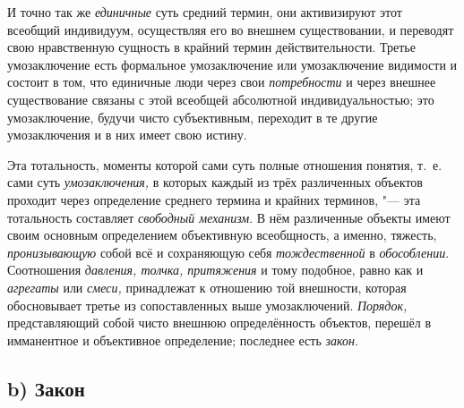 И точно так же
{\em единичные} суть
средний термин, они активизируют этот всеобщий индивидуум, осуществляя его
во внешнем существовании, и переводят свою нравственную сущность в крайний
термин
действительности.
Третье умозаключение есть формальное умозаключение или
умозаключение видимости и состоит в том, что единичные люди через свои
{\em потребности} и через
внешнее существование связаны с этой всеобщей абсолютной индивидуальностью;
это умозаключение, будучи чисто субъективным, переходит в те другие
умозаключения и в них имеет свою
истину\label{bkm:bm52c}.

Эта тотальность, моменты которой сами суть полные отношения
понятия, т.~е. сами суть
{\em умозаключения,} в
которых каждый из трёх различенных объектов проходит через определение
среднего термина и крайних терминов, "--- эта тотальность
составляет {\em свободный механизм}.
В нём различенные объекты имеют своим основным определением
объективную всеобщность, а именно, тяжесть,
{\em пронизывающую} собой
всё и сохраняющую себя
{\em тождественной} в
{\em обособлении}.
Соотношения {\em давления,
толчка, притяжения} и тому подобное, равно как и
{\em агрегаты} или
{\em смеси,} принадлежат
к отношению той внешности, которая обосновывает третье из
сопоставленных выше умозаключений.
{\em Порядок,}
представляющий собой чисто внешнюю определённость объектов,
перешёл в имманентное и объективное определение; последнее есть
{\em закон}.

\subsection[b) Закон]{b) Закон}

